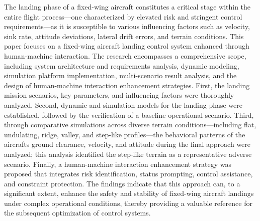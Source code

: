
\begin{abstracten}

The landing phase of a fixed-wing aircraft constitutes a critical stage
within the entire flight process---one characterized by elevated risk
and stringent control requirements---as it is susceptible to various
influencing factors such as velocity, sink rate, attitude deviations,
lateral drift errors, and terrain conditions. This paper focuses on a
fixed-wing aircraft landing control system enhanced through
human-machine interaction. The research encompasses a comprehensive
scope, including system architecture and requirements analysis, dynamic
modeling, simulation platform implementation, multi-scenario result
analysis, and the design of human-machine interaction enhancement
strategies. First, the landing mission scenarios, key parameters, and
influencing factors were thoroughly analyzed. Second, dynamic and
simulation models for the landing phase were established, followed by
the verification of a baseline operational scenario. Third, through
comparative simulations across diverse terrain conditions---including
flat, undulating, ridge, valley, and step-like profiles---the behavioral
patterns of the aircraft\textquotesingle s ground clearance, velocity,
and attitude during the final approach were analyzed; this analysis
identified the step-like terrain as a representative adverse scenario.
Finally, a human-machine interaction enhancement strategy was proposed
that integrates risk identification, status prompting, control
assistance, and constraint protection. The findings indicate that this
approach can, to a significant extent, enhance the safety and stability
of fixed-wing aircraft landings under complex operational conditions,
thereby providing a valuable reference for the subsequent optimization
of control systems.

\end{abstracten}
